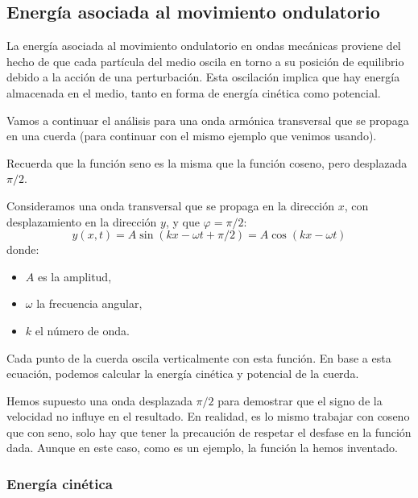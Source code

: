 \subsection{Energía asociada al movimiento ondulatorio}
\label{sec:wave_energy}

La energía asociada al movimiento ondulatorio en ondas mecánicas proviene del hecho de que cada partícula del medio oscila en torno a su posición de equilibrio debido a la acción de una perturbación. Esta oscilación implica que hay energía almacenada en el medio, tanto en forma de energía cinética como potencial.

Vamos a continuar el análisis para una onda armónica transversal que se propaga en una cuerda (para continuar con el mismo ejemplo que venimos usando). 

\begin{tcolorbox}[myconclusion]
  Recuerda que la función seno es la misma que la función coseno, pero desplazada \(\pi/2\).
\end{tcolorbox}

Consideramos una onda transversal que se propaga en la dirección \(x\), con desplazamiento en la dirección \(y\), y que \(\varphi = \pi/2\):
\[
y(x,t) = A \sin(kx - \omega t + \pi/2) = \boxed{A \cos(kx - \omega t)}
\]
donde:
\begin{itemize}
  \item \(A\) es la amplitud,
  \item \(\omega\) la frecuencia angular,
  \item \(k\) el número de onda.
\end{itemize}

Cada punto de la cuerda oscila verticalmente con esta función. En base a esta ecuación, podemos calcular la energía cinética y potencial de la cuerda.

\begin{tcolorbox}[myconclusion]
  Hemos supuesto una onda desplazada \(\pi/2\) para demostrar que el signo de la velocidad no influye en el resultado. En realidad, es lo mismo trabajar con coseno que con seno, solo hay que tener la precaución de respetar el desfase en la función dada. Aunque en este caso, como es un ejemplo, la función la hemos inventado.
\end{tcolorbox}

\subsubsection{Energía cinética}

